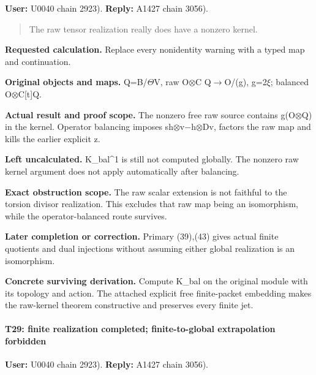 \textbf{User:} U0040
\protect{} chain 2923).
\textbf{Reply:} A1427
\protect{} chain 3056).

\begin{quote}
The raw tensor realization really does have a nonzero kernel.
\end{quote}

\textbf{Requested calculation.} Replace every nonidentity warning with a
typed map and continuation.

\textbf{Original objects and maps.}
Q=B/\allowbreak{}\ensuremath{Θ}\allowbreak{}V, raw
O\allowbreak{}\ensuremath{⊗}\allowbreak{}C
Q\allowbreak{}\ensuremath{→}\allowbreak{}O/(g),
g=2\allowbreak{}\ensuremath{ξ}\allowbreak{}; balanced
O\allowbreak{}\ensuremath{⊗}\allowbreak{}C[t]Q.

\textbf{Actual result and proof scope.} The nonzero free raw source
contains g(O\allowbreak{}\ensuremath{⊗}\allowbreak{}Q) in the kernel.
Operator balancing imposes
sh\allowbreak{}\ensuremath{⊗}\allowbreak{}v\allowbreak{}\ensuremath{−}\allowbreak{}h\allowbreak{}\ensuremath{⊗}\allowbreak{}Dv,
factors the raw map and kills the earlier explicit z.

\textbf{Left uncalculated.} K\_bal\^{}1 is still not computed globally.
The nonzero raw kernel argument does not apply automatically after
balancing.

\textbf{Exact obstruction scope.} The raw scalar extension is not
faithful to the torsion divisor realization. This excludes that raw map
being an isomorphism, while the operator-balanced route survives.

\textbf{Later completion or correction.} Primary (39),(43) gives actual
finite quotients and dual injections without assuming either global
realization is an isomorphism.

\textbf{Concrete surviving derivation.} Compute K\_bal on the original
module with its topology and action. The attached explicit free
finite-packet embedding makes the raw-kernel theorem constructive and
preserves every finite jet.

\paragraph{T29: finite realization completed; finite-to-global
extrapolation
forbidden}\label{t29-finite-realization-completed-finite-to-global-extrapolation-forbidden}

\textbf{User:} U0040
\protect{} chain 2923).
\textbf{Reply:} A1427
\protect{} chain 3056).

